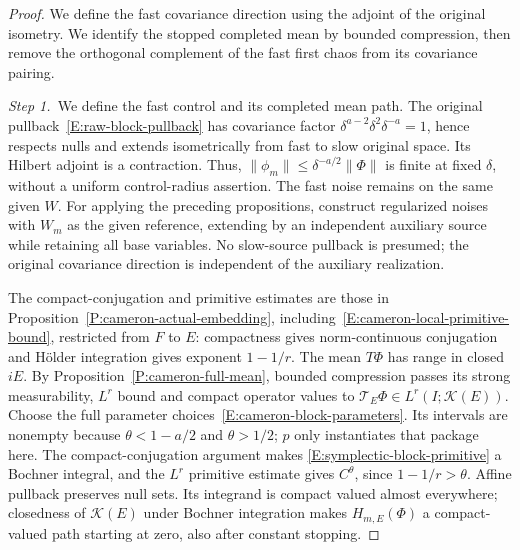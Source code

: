 \begin{proof}
  We define the fast covariance direction using the adjoint of the original
  isometry. We identify the stopped completed mean by bounded compression,
  then remove the orthogonal complement of the fast first chaos from its
  covariance pairing.


  \medskip
  \noindent\textit{Step 1.~}We define the fast control and its completed mean
  path.
  The original pullback~\eqref{E:raw-block-pullback} has covariance factor
  $\delta^{a-2}\delta^2\delta^{-a} = 1$, hence respects nulls and extends
  isometrically from fast to slow original space. Its Hilbert adjoint is a
  contraction. Thus, $\|\phi_m\| \le \delta^{-a/2}\|\Phi\|$ is finite at fixed
  $\delta$, without a uniform control-radius assertion. The fast noise remains
  on the same given $W$. For applying the preceding propositions, construct
  regularized noises with $W_m$ as the given reference, extending by an
  independent auxiliary source while retaining all base variables. No
  slow-source pullback is presumed; the original covariance direction is
  independent of the auxiliary realization.

  The compact-conjugation and primitive estimates are those in
  Proposition~\ref{P:cameron-actual-embedding},
  including~\eqref{E:cameron-local-primitive-bound}, restricted from $F$ to
  $E$: compactness gives norm-continuous conjugation and Hölder integration
  gives exponent $1-1/r$.
  The mean $T\Phi$ has range in closed $iE$. By
  Proposition~\ref{P:cameron-full-mean}, bounded compression passes its strong
  measurability, $L^r$ bound and compact operator values to $\mathcal{T}_E\Phi
  \in L^r(I;\mathcal{K}(E))$. Choose the full parameter
  choices~\eqref{E:cameron-block-parameters}. Its intervals are nonempty because
  $\theta < 1-a/2$ and $\theta > 1/2$; $p$ only instantiates that package here.
  The compact-conjugation argument makes \eqref{E:symplectic-block-primitive} a
  Bochner integral, and the $L^r$ primitive estimate gives $C^\theta$, since
  $1-1/r > \theta$. Affine pullback preserves null sets. Its integrand is
  compact valued almost everywhere; closedness of $\mathcal{K}(E)$ under Bochner
  integration makes $H_{m,E}(\Phi)$ a compact-valued path starting at zero, also
  after constant stopping.



\end{proof}
